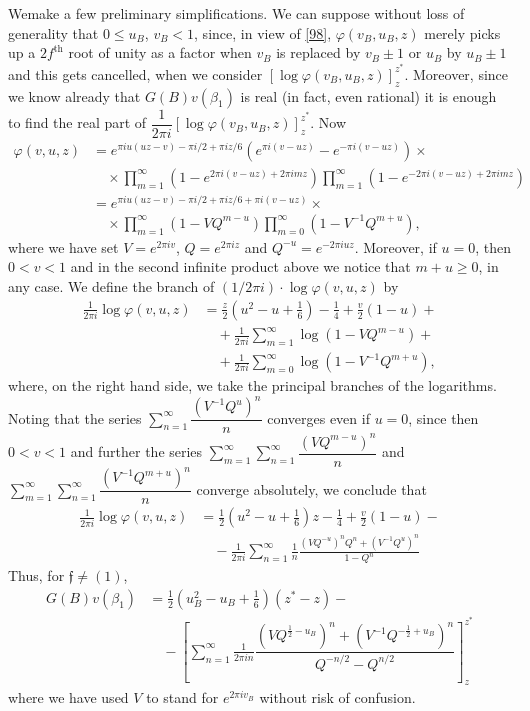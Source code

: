 We\pageoriginale make a few preliminary simplifications. We can
suppose without loss of generality that $0\leq u_{B}$, $v_{B}<1$,
since, in view of \eqref{98}, $\varphi(v_{B},u_{B},z)$ merely picks up
a $2f^{\text{th}}$ root of unity as a factor when $v_{B}$ is replaced
by $v_{B}\pm 1$ or $u_{B}$ by $u_{B}\pm 1$ and this gets cancelled,
when we consider
$[\log\varphi(v_{B},u_{B},z)]^{z^{\ast}}_{z}$. Moreover, since we know
already that $G(B)v(\beta_{1})$ is real (in fact, even rational) it is
enough to find the real part of $\dfrac{1}{2\pi
  i}[\log\varphi(v_{B},u_{B},z)]^{z^{\ast}}_{z}$. Now
\begin{align*}
\varphi(v,u,z) &= e^{\pi iu(uz-v)-\pi i/2+\pi iz/6}(e^{\pi
  i(v-uz)}-e^{-\pi i(v-uz)})\times\\
&\quad \times\prod^{\infty}_{m=1}(1-e^{2\pi i(v-uz)+2\pi
  imz})\prod^{\infty}_{m=1}(1-e^{-2\pi i(v-uz)+2\pi imz})\\
&= e^{\pi iu(uz-v)-\pi i/2+\pi iz/6+\pi i(v-uz)}\times\\
&\quad
\times\prod^{\infty}_{m=1}(1-VQ^{m-u})\prod^{\infty}_{m=0}(1-V^{-1}Q^{m+u}), 
\end{align*}
where we have set $V=e^{2\pi iv}$, $Q=e^{2\pi iz}$ and
$Q^{-u}=e^{-2\pi iuz}$. Moreover, if $u=0$, then $0<v<1$ and in the
second infinite product above we notice that $m+u\geq 0$, in any
case. We define the branch of $(1/2\pi i)\cdot \log\varphi(v,u,z)$ by
\begin{align*}
\frac{1}{2\pi i}\log\varphi(v,u,z) &=
\frac{z}{2}\left(u^{2}-u+\frac{1}{6}\right)-\frac{1}{4}+\frac{v}{2}(1-u)+\\
&\quad +\frac{1}{2\pi i}\sum^{\infty}_{m=1}\log(1-VQ^{m-u})+\\
&\quad +\frac{1}{2\pi i}\sum^{\infty}_{m=0}\log(1-V^{-1}Q^{m+u}),
\end{align*}
where, on the right hand side, we take the principal branches of the
logarithms. Noting that the series
$\sum\limits^{\infty}_{n=1}\dfrac{(V^{-1}Q^{u})^{n}}{n}$ converges
even if $u=0$, since then $0<v<1$ and further the series
$\sum\limits^{\infty}_{m=1}\sum^{\infty}_{n=1}\dfrac{(VQ^{m-u})^{n}}{n}$
and
$\sum\limits^{\infty}_{m=1}\sum\limits^{\infty}_{n=1}\dfrac{(V^{-1}Q^{m+u})^{n}}{n}$
converge absolutely, we conclude that 
\begin{align*}
\frac{1}{2\pi i}\log\varphi(v,u,z) &=
\frac{1}{2}\left(u^{2}-u+\frac{1}{6}\right)z-\frac{1}{4}+\frac{v}{2}(1-u)-\\
&\quad -\frac{1}{2\pi
  i}\sum^{\infty}_{n=1}\frac{1}{n}\frac{(VQ^{-u})^{n}Q^{n}+(V^{-1}Q^{u})^{n}}{1-Q^{n}} 
\end{align*}\pageoriginale
Thus, for $\mathfrak{f}\neq (1)$,
\begin{align*}
G(B)v(\beta_{1}) &=
\frac{1}{2}\left(u^{2}_{B}-u_{B}+\frac{1}{6}\right)(z^{\ast}-z)-\\
&\quad -\left[\sum^{\infty}_{n=1}\frac{1}{2\pi
    in}\dfrac{(VQ^{\frac{1}{2}-u_{B}})^{n}+(V^{-1}Q^{-\frac{1}{2}+u_{B}})^{n}}{Q^{-n/2}-Q^{n/2}}\right]^{z^{\ast}}_{z}\tag{114}\label{114} 
\end{align*}
where we have used $V$ to stand for $e^{2\pi iv_{B}}$ without risk of
confusion.

